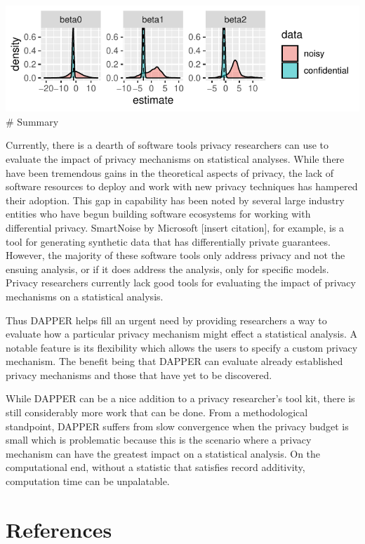 \includegraphics{dppaper_files/figure-latex/unnamed-chunk-22-1.pdf}
\# Summary

Currently, there is a dearth of software tools privacy researchers can use
to evaluate the impact of privacy mechanisms on statistical analyses.
While there have been tremendous gains in the theoretical aspects of privacy,
the lack of software resources to deploy and work with new privacy techniques has
hampered their adoption. This gap in capability has been noted by several
large industry entities who have begun building software ecosystems for
working with differential privacy. SmartNoise by Microsoft {[}insert citation{]}, for example,
is a tool for generating synthetic data that has differentially private guarantees.
However, the majority of these software tools only address privacy and not the
ensuing analysis, or if it does address the analysis, only for specific models.
Privacy researchers currently lack good tools for evaluating the impact
of privacy mechanisms on a statistical analysis.

Thus DAPPER helps fill an urgent need by providing researchers a way to evaluate
how a particular privacy mechanism might effect a statistical analysis. A notable
feature is its flexibility which allows the users to specify a custom
privacy mechanism. The benefit being that DAPPER can evaluate already
established privacy mechanisms and those that have yet to be discovered.

While DAPPER can be a nice addition to a privacy researcher's tool kit, there
is still considerably more work that can be done. From a methodological standpoint,
DAPPER suffers from slow convergence when the privacy budget is small which is problematic
because this is the scenario where a privacy mechanism can have the greatest impact
on a statistical analysis. On the computational end, without a statistic that satisfies
record additivity, computation time can be unpalatable.

\hypertarget{references}{%
\section*{References}\label{references}}

